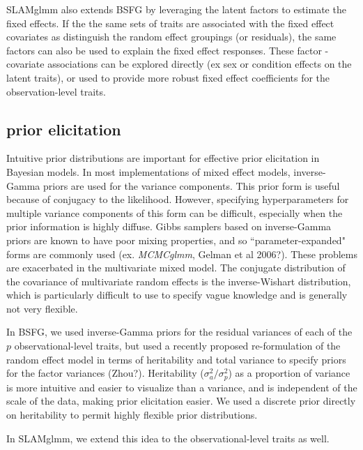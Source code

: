 \documentclass[11pt]{amsart}
\begin{document}
SLAMglmm also extends BSFG by leveraging the latent factors to estimate the fixed effects. If the the same sets of traits are associated with the fixed effect covariates as distinguish the random effect groupings (or residuals), the same factors can also be used to explain the fixed effect responses. These factor - covariate associations can be explored directly (ex sex or condition effects on the latent traits), or used to provide more robust fixed effect coefficients for the observation-level traits.

\subsection{prior elicitation}
Intuitive prior distributions are important for effective prior elicitation in Bayesian models. In most implementations of mixed effect models, inverse-Gamma priors are used for the variance components. This prior form is useful because of conjugacy to the likelihood. However, specifying hyperparameters for multiple variance components of this form can be difficult, especially when the prior information is highly diffuse. Gibbs samplers based on inverse-Gamma priors are known to have poor mixing properties, and so ``parameter-expanded" forms are commonly used (ex. \emph{MCMCglmm}, Gelman et al 2006?). These problems are exacerbated in the multivariate mixed model. The conjugate distribution of the covariance of multivariate random effects is the inverse-Wishart distribution, which is particularly difficult to use to specify vague knowledge and is generally not very flexible.

In BSFG, we used inverse-Gamma priors for the residual variances of each of the $p$ observational-level traits, but used a recently proposed re-formulation of the random effect model in terms of heritability and total variance to specify priors for the factor variances (Zhou?). Heritability ($\sigma^2_a / \sigma^2_p$) as a proportion of variance is more intuitive and easier to visualize than a variance, and is independent of the scale of the data, making prior elicitation easier. We used a discrete prior directly on heritability to permit highly flexible prior distributions. 

In SLAMglmm, we extend this idea to the observational-level traits as well. 
\end{document}
